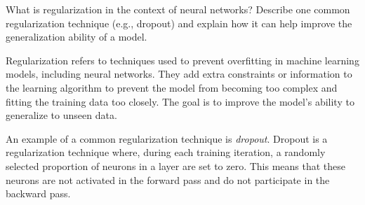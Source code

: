 \begin{ejercicio}[Bonus]
    What is regularization in the context of neural networks? Describe one common regularization technique (e.g., dropout) and explain how it can help improve the generalization ability of a model.

    Regularization refers to techniques used to prevent overfitting in machine learning models, including neural networks. They add extra constraints or information to the learning algorithm to prevent the model from becoming too complex and fitting the training data too closely. The goal is to improve the model's ability to generalize to unseen data.

    An example of a common regularization technique is \emph{dropout}. Dropout is a regularization technique where, during each training iteration, a randomly selected proportion of neurons in a layer are set to zero. This means that these neurons are not activated in the forward pass and do not participate in the backward pass.
\end{ejercicio}
